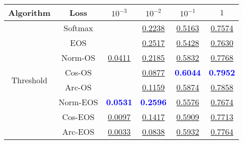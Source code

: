 \begin{table}[t]
\centering
\begin{tabularx}{.7\textwidth}{c|c|cccc}
\bf Algorithm & \bf Loss & $10^{-3}$ & $10^{-2}$ & $10^{-1}$ & $1$\\\hline\hline
\multirow{8}{*}{Threshold} & Softmax & & \underline{0.2238} & \underline{0.5163} & \underline{0.7574}\\
 & EOS & & \underline{0.2517} & \underline{0.5428} & \underline{0.7630}\\
 & Norm-OS & \underline{0.0411} & \underline{0.2185} & \underline{0.5832} & \underline{0.7768}\\
 & Cos-OS & & \underline{0.0877} & \textcolor{blue}{\bf 0.6044} & \textcolor{blue}{\bf 0.7952}\\
 & Arc-OS & & \underline{0.1159} & \underline{0.5874} & \underline{0.7858}\\
 & Norm-EOS & \textcolor{blue}{\bf 0.0531} & \textcolor{blue}{\bf 0.2596} & \underline{0.5576} & \underline{0.7674}\\
 & Cos-EOS & \underline{0.0097} & \underline{0.1417} & \underline{0.5909} & \underline{0.7713}\\
 & Arc-EOS & \underline{0.0033} & \underline{0.0838} & \underline{0.5932} & \underline{0.7764}\\
\hline
\end{tabularx}
\end{table}